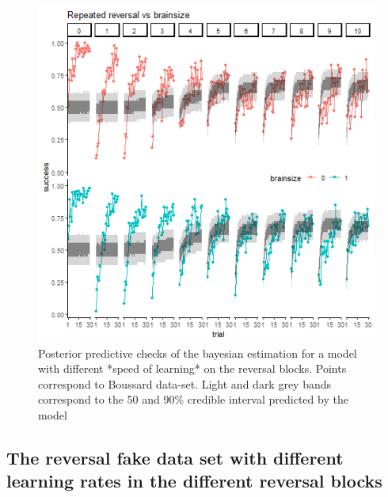 \documentclass[
]{article}
\begin{document}
\begin{figure}

\includegraphics{boussardREV_ppchecks} \hfill{}

\caption{Posterior predictive checks of the bayesian estimation for a model with different *speed of learning* on the reversal blocks. Points correspond to Boussard data-set. Light and dark grey bands correspond to the 50 and 90\% credible interval predicted by the model}\label{fig:ppchecks_boussard_rev}
\end{figure}

\hypertarget{the-reversal-fake-data-set-with-different-learning-rates-in-the-different-reversal-blocks}{%
\subsection{The reversal fake data set with different learning rates in
the different reversal
blocks}\label{the-reversal-fake-data-set-with-different-learning-rates-in-the-different-reversal-blocks}}
\end{document}
